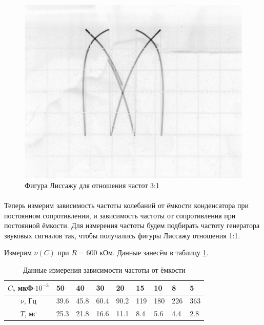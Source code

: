 \documentclass[a4paper,12pt]{article} %
\begin{document}
\begin{figure}[h]
\begin{center}
\begin{minipage}[h]{0.49\textwidth}
\includegraphics[width=\textwidth]{3-1.jpg}
\caption{Фигура Лиссажу для отношения частот 3:1}
\label{fig:lis31}
\end{minipage}
\end{center}
\end{figure}

\paragraph{} Теперь измерим зависимость частоты колебаний от ёмкости конденсатора при постоянном сопротивлении, и зависимость частоты от сопротивления при постоянной ёмкости. Для измерения частоты будем подбирать частоту генератора звуковых сигналов так, чтобы получались фигуры Лиссажу отношения 1:1.

Измерим $\nu(C)$ при $R = 600$ кОм. Данные занесём в таблицу \ref{tab2}.

\begin{table}[h]
\begin{center}
\begin{tabularx}{\textwidth}{|c||X|X|X|X|X|X|X|X|}
\hline 
$C$, мкФ$\cdot 10^{-3}$ & 50 & 40 & 30 & 20 & 15 & 10 & 8 & 5 \\ 
\hline 
$\nu$, Гц & 39.6 & 45.8 & 60.4 & 90.2 & 119 & 180 & 226 & 363 \\ 
\hline 
$T$, мс & 25.3 & 21.8 & 16.6 & 11.1 & 8.4 & 5.6 & 4.4 & 2.8 \\ 
\hline 
\end{tabularx} 
\caption{Данные измерения зависимости частоты от ёмкости}
\label{tab2}
\end{center}
\end{table}
\end{document}
